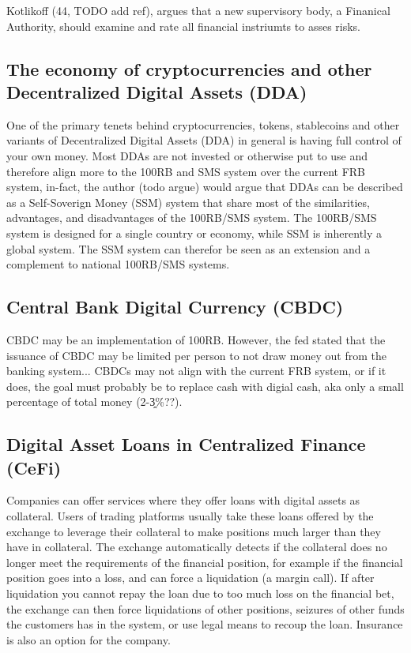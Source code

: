 Kotlikoff (44, TODO add ref), argues that a new supervisory body, a Finanical Authority, should examine and rate all financial instriumts to asses risks. 

\subsection{The economy of cryptocurrencies and other Decentralized Digital Assets (DDA)}
One of the primary tenets behind cryptocurrencies, tokens, stablecoins and other variants of Decentralized Digital Assets (DDA) in general is having full control of your own money. Most DDAs are not invested or otherwise put to use and therefore align more to the 100RB and SMS system over the current FRB system, in-fact, the author (todo argue) would argue that DDAs can be described as a Self-Soverign Money (SSM) system that share most of the similarities, advantages, and disadvantages of the 100RB/SMS system. The 100RB/SMS system is designed for a single country or economy, while SSM is inherently a global system. The SSM system can therefor be seen as an extension and a complement to national 100RB/SMS systems.

\subsection{Central Bank Digital Currency (CBDC)}
CBDC may be an implementation of 100RB. However, the fed stated that the issuance of CBDC may be limited per person to not draw money out from the banking system... CBDCs may not align with the current FRB system, or if it does, the goal must probably be to replace cash with digial cash, aka only a small percentage of total money (2-3̭\%??). 

\subsection{Digital Asset Loans in Centralized Finance (CeFi)}
Companies can offer services where they offer loans with digital assets as collateral. Users of trading platforms usually take these loans offered by the exchange to leverage their collateral to make positions much larger than they have in collateral. The exchange automatically detects if the collateral does no longer meet the requirements of the financial position, for example if the financial position goes into a loss, and can force a liquidation (a margin call). If after liquidation you cannot repay the loan due to too much loss on the financial bet, the exchange can then force liquidations of other positions, seizures of other funds the customers has in the system, or use legal means to recoup the loan. Insurance is also an option for the company.

